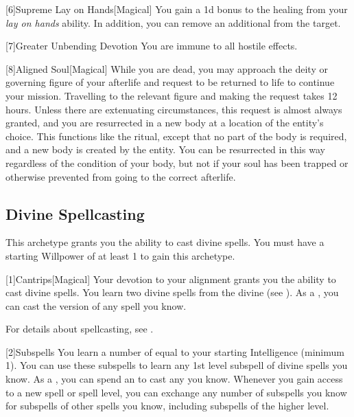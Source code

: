         [6]{Supreme Lay on Hands}[Magical]
        You gain a \plus1d bonus to the healing from your \textit{lay on hands} ability.
        In addition, you can remove an additional  from the target.

        [7]{Greater Unbending Devotion}
        You are immune to all hostile  effects.

        [8]{Aligned Soul}[Magical]
        While you are dead, you may approach the deity or governing figure of your afterlife and request to be returned to life to continue your mission.
        Travelling to the relevant figure and making the request takes 12 hours.
        Unless there are extenuating circumstances, this request is almost always granted, and you are resurrected in a new body at a location of the entity's choice.
        This functions like the  ritual, except that no part of the body is required, and a new body is created by the entity.
        You can be resurrected in this way regardless of the condition of your body, but not if your soul has been trapped or otherwise prevented from going to the correct afterlife.

    \subsection{Divine Spellcasting}
        This archetype grants you the ability to cast divine spells.
        You must have a starting Willpower of at least 1 to gain this archetype.

        [1]{Cantrips}[Magical]
        Your devotion to your alignment grants you the ability to cast divine spells.
        You learn two divine spells from the divine  (see ).
        As a , you can cast the  version of any spell you know.

        For details about spellcasting, see .

        [2]{Subspells} You learn a number of  equal to your starting Intelligence  (minimum 1).
        You can use these subspells to learn any 1st level subspell of divine spells you know.
        As a , you can spend an  to cast any  you know.
        Whenever you gain access to a new spell or spell level, you can exchange any number of subspells you know for subspells of other spells you know, including subspells of the higher level.


